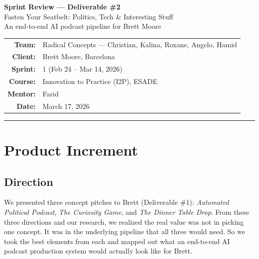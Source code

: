 \documentclass[11pt,a4paper]{article}
\begin{document}
\thispagestyle{plain}

\begin{center}
  {\LARGE\bfseries Sprint Review --- Deliverable \#2}\\[0.8em]
  {\large Fasten Your Seatbelt: Politics, Tech \& Interesting Stuff}\\[0.3em]
  {\normalsize An end-to-end AI podcast pipeline for Brett Moore}\\[2em]
  \begin{tabular}{rl}
    \textbf{Team:} & Radical Concepts --- Christian, Kalina, Roxane, Angelo, Hamid \\
    \textbf{Client:} & Brett Moore, Barcelona \\
    \textbf{Sprint:} & 1 (Feb 24 -- Mar 14, 2026) \\
    \textbf{Course:} & Innovation to Practice (I2P), ESADE \\
    \textbf{Mentor:} & Farid \\
    \textbf{Date:} & March 17, 2026 \\
  \end{tabular}
\end{center}

\vspace{1em}
\hrule
\vspace{1em}

\begin{center}
\end{center}
\vspace{0.5em}

\section{Product Increment}

\subsection{Direction}

We presented three concept pitches to Brett (Deliverable \#1): \emph{Automated Political Podcast}, \emph{The Curiosity Game}, and \emph{The Dinner Table Drop}. From these three directions and our research, we realized the real value was not in picking one concept. It was in the underlying pipeline that all three would need. So we took the best elements from each and mapped out what an end-to-end AI podcast production system would actually look like for Brett.
\end{document}
